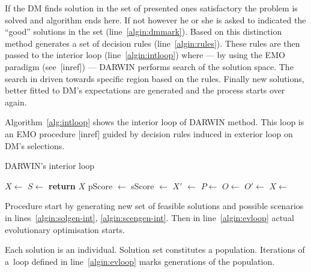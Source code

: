 If the DM finds solution in the set of presented ones satisfactory the problem
is solved and algorithm ends here. If not however he or she is asked to
indicated the ``good'' solutions in the set (line~\ref{algin:dmmark}).  Based
on this distinction method generates a set of decision rules
(line~\ref{algin:rules}). These rules are then passed to the interior loop
(line~\ref{algin:intloop}) where --- by using the EMO paradigm (see~[inref])
--- DARWIN performs search of the solution space. The search in driven towards
specific region based on the rules. Finally new solutions, better fitted to
DM's expectations are generated and the process starts over again.

Algorithm~\ref{alg:intloop} shows the interior loop of DARWIN method. This
loop is an EMO procedure [inref] guided by decision rules induced in exterior
loop on DM's selections.

\begin{algorithm}
\caption{DARWIN's interior loop}\label{alg:intloop}
  \begin{algorithmic}[1]
    \State $X \gets$  \label{algin:solgen-int}
    \State $S \gets$  \label{algin:scengen-int}
    \Loop \label{algin:evloop}
     \label{algin:evstart-int} 
    \State {}
    \EndFor{} \label{algin:evstop-int}
    \State \textbf{return} $X$
    \EndIf
    \State pScore $\gets$  \label{algin:ps}
    \State sScore $\gets$  \label{algin:ss}
    \State $X'$ $\gets$  \label{algin:rank}
    \State $P \gets$  \label{algin:select}
    \State $O \gets$  \label{algin:off}
    \State $O' \gets$  \label{algin:mut}
    \State $X \gets$  \label{algin:merge}
    \EndLoop
    \EndProcedure{}
  \end{algorithmic}
\end{algorithm}

Procedure start by generating new set of feasible solutions and possible
scenarios in lines~\ref{algin:solgen-int}, \ref{algin:scengen-int}. Then in
line~\ref{algin:evloop} actual evolutionary optimisation starts.

Each solution is an individual. Solution set constitutes a
population. Iterations of a~loop defined in line~\ref{algin:evloop} marks 
generations of the population.

